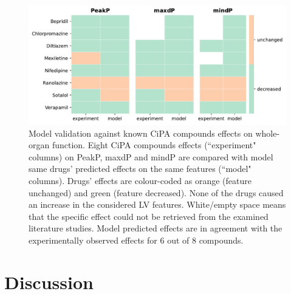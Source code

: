 \begin{figure}[!ht]
    \myfloatalign
    \includegraphics[width=1\textwidth]{figures/chapter06/model_vs_experiments.pdf}
    \caption{Model validation against known CiPA compounds effects on whole-organ function. Eight CiPA compounds effects (``experiment" columns) on PeakP, maxdP and mindP are compared with model same drugs' predicted effects on the same features (``model" columns). Drugs' effects are colour-coded as orange (feature unchanged) and green (feature decreased). None of the drugs caused an increase in the considered LV features. White/empty space means that the specific effect could not be retrieved from the examined literature studies. Model predicted effects are in agreement with the experimentally observed effects for $6$ out of $8$ compounds.}
    \label{fig:validationtable}
\end{figure}


%
%
%
\section{Discussion}\label{sec:ch6discussion}
